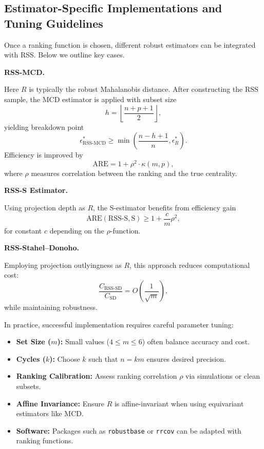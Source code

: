 \documentclass[12pt]{article}
\makeatletter
\let\oldparagraph\paragraph
\renewcommand{\paragraph}{
    \@ifstarcorollary
      \xxxParagraphStar
      \xxxParagraphNoStar
  }
\newcommand{\xxxParagraphStar}[1]{\oldparagraph*{#1}\mbox{}}
\newcommand{\xxxParagraphNoStar}[1]{\oldparagraph{#1}\mbox{}}
\makeatother
\begin{document}
\subsection{Estimator-Specific Implementations and Tuning Guidelines}

Once a ranking function is chosen, different robust estimators can be integrated with RSS. Below we outline key cases.

{\bf RSS-MCD.}

Here $R$ is typically the robust Mahalanobis distance. After constructing the RSS sample, the MCD estimator is applied with subset size
\[
h = \left\lfloor \frac{n + p + 1}{2} \right\rfloor,
\]
yielding breakdown point
\[
\epsilon^*_{\text{RSS-MCD}} \geq \min\left(\frac{n-h+1}{n}, \epsilon^*_R\right).
\]
Efficiency is improved by
\[
\text{ARE} = 1 + \rho^2 \cdot \kappa(m, p),
\]
where $\rho$ measures correlation between the ranking and the true centrality.

{\bf RSS-S Estimator.}

Using projection depth as $R$, the S-estimator benefits from efficiency gain
\[
\text{ARE}(\text{RSS-S}, \text{S}) \geq 1 + \frac{c}{m} \rho^2,
\]
for constant $c$ depending on the $\rho$-function.

{\bf RSS-Stahel–Donoho.}

Employing projection outlyingness as $R$, this approach reduces computational cost:
\[
\frac{C_{\text{RSS-SD}}}{C_{\text{SD}}} = O\left(\frac{1}{\sqrt{m}}\right),
\]
while maintaining robustness.

\vspace{0.5em}
In practice, successful implementation requires careful parameter tuning:
\begin{itemize}
    \item \textbf{Set Size ($m$):} Small values ($4 \leq m \leq 6$) often balance accuracy and cost.
    \item \textbf{Cycles ($k$):} Choose $k$ such that $n=km$ ensures desired precision.
    \item \textbf{Ranking Calibration:} Assess ranking correlation $\rho$ via simulations or clean subsets.
    \item \textbf{Affine Invariance:} Ensure $R$ is affine-invariant when using equivariant estimators like MCD.
    \item \textbf{Software:} Packages such as \texttt{robustbase} or \texttt{rrcov} can be adapted with ranking functions.
\end{itemize}
\end{document}
